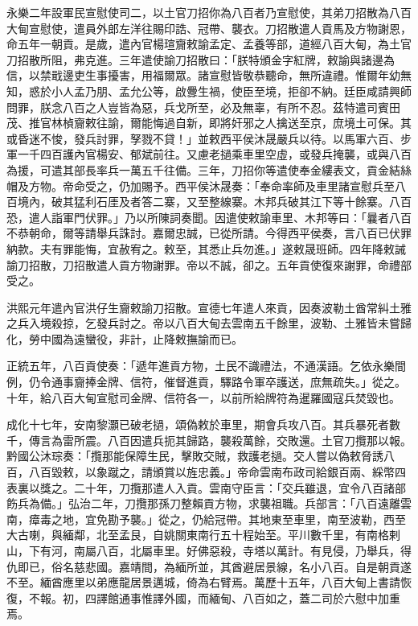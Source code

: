 \begin{pinyinscope}
永樂二年設軍民宣慰使司二，以土官刀招你為八百者乃宣慰使，其弟刀招散為八百大甸宣慰使，遣員外郎左洋往賜印誥、冠帶、襲衣。刀招散遣人貢馬及方物謝恩，命五年一朝貢。是歲，遣內官楊瑄齎敕諭孟定、孟養等部，道經八百大甸，為土官刀招散所阻，弗克進。三年遣使諭刀招散曰：「朕特頒金字紅牌，敕諭與諸邊為信，以禁戢邊吏生事擾害，用福爾眾。諸宣慰皆敬恭聽命，無所違禮。惟爾年幼無知，惑於小人孟乃朋、孟允公等，啟釁生禍，使臣至境，拒卻不納。廷臣咸請興師問罪，朕念八百之人豈皆為惡，兵戈所至，必及無辜，有所不忍。茲特遣司賓田茂、推官林楨齎敕往諭，爾能悔過自新，即將奸邪之人擒送至京，庶境土可保。其或昏迷不悛，發兵討罪，孥戮不貸！」並敕西平侯沐晟嚴兵以待。以馬軍六百、步軍一千四百護內官楊安、郁斌前往。又慮老撾乘車里空虛，或發兵掩襲，或與八百為援，可遣其部長率兵一萬五千往備。三年，刀招你等遣使奉金縷表文，貢金結絲帽及方物。帝命受之，仍加賜予。西平侯沐晟奏：「奉命率師及車里諸宣慰兵至八百境內，破其猛利石厓及者答二寨，又至整線寨。木邦兵破其江下等十餘寨。八百恐，遣人詣軍門伏罪。」乃以所陳詞奏聞。因遣使敕諭車里、木邦等曰：「曩者八百不恭朝命，爾等請舉兵誅討。嘉爾忠誠，已從所請。今得西平侯奏，言八百已伏罪納款。夫有罪能悔，宜赦宥之。敕至，其悉止兵勿進。」遂敕晟班師。四年降敕誡諭刀招散，刀招散遣人貢方物謝罪。帝以不誠，卻之。五年貢使復來謝罪，命禮部受之。

洪熙元年遣內官洪仔生齎敕諭刀招散。宣德七年遣人來貢，因奏波勒土酋常糾土雅之兵入境殺掠，乞發兵討之。帝以八百大甸去雲南五千餘里，波勒、土雅皆未嘗歸化，勞中國為遠蠻役，非計，止降敕撫諭而已。

正統五年，八百貢使奏：「遞年進貢方物，土民不識禮法，不通漢語。乞依永樂間例，仍令通事齎捧金牌、信符，催督進貢，驛路令軍卒護送，庶無疏失。」從之。十年，給八百大甸宣慰司金牌、信符各一，以前所給牌符為暹羅國寇兵焚毀也。

成化十七年，安南黎灝已破老撾，頌偽敕於車里，期會兵攻八百。其兵暴死者數千，傳言為雷所震。八百因遣兵扼其歸路，襲殺萬餘，交敗還。土官刀攬那以報。黔國公沐琮奏：「攬那能保障生民，擊敗交賊，救護老撾。交人嘗以偽敕脅誘八百，八百毀敕，以象蹴之，請頒賞以旌忠義。」帝命雲南布政司給銀百兩、綵幣四表裏以獎之。二十年，刀攬那遣人入貢。雲南守臣言：「交兵雖退，宜令八百諸部飭兵為備。」弘治二年，刀攬那孫刀整賴貢方物，求襲祖職。兵部言：「八百遠離雲南，瘴毒之地，宜免勘予襲。」從之，仍給冠帶。其地東至車里，南至波勒，西至大古喇，與緬鄰，北至孟艮，自姚關東南行五十程始至。平川數千里，有南格剌山，下有河，南屬八百，北屬車里。好佛惡殺，寺塔以萬計。有見侵，乃舉兵，得仇即已，俗名慈悲國。嘉靖間，為緬所並，其酋避居景線，名小八百。自是朝貢遂不至。緬酋應里以弟應龍居景邁城，倚為右臂焉。萬歷十五年，八百大甸上書請恢復，不報。初，四譯館通事惟譯外國，而緬甸、八百如之，蓋二司於六慰中加重焉。


\end{pinyinscope}